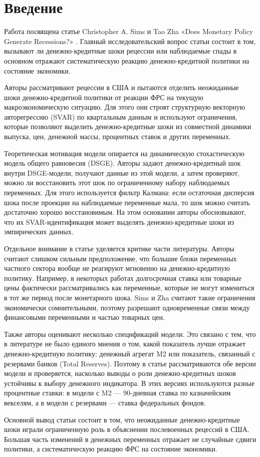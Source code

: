 \section*{Введение}
Работа посвящена статье Christopher A. Sims и Tao Zha «Does Monetary Policy Generate Recessions?» \cite{SIMS2006}. Главный исследовательский вопрос статьи состоит в том, вызывают ли денежно-кредитные шоки рецессии или наблюдаемые спады в основном отражают систематическую реакцию денежно-кредитной политики на состояние экономики.

Авторы рассматривают рецессии в США и пытаются отделить неожиданные шоки денежно-кредитной политики от реакции ФРС на текущую макроэкономическую ситуацию. Для этого они строят структурную векторную авторегрессию (SVAR) по квартальным данным и используют ограничения, которые позволяют выделить денежно-кредитные шоки из совместной динамики выпуска, цен, денежной массы, процентных ставок и других переменных.

Теоретическая мотивация модели опирается на динамическую стохастическую модель общего равновесия (DSGE). Авторы задают денежно-кредитный шок внутри DSGE-модели, получают данные из этой модели, а затем проверяют, можно ли восстановить этот шок по ограниченному набору наблюдаемых переменных. Для этого используется фильтр Калмана: если остаточная дисперсия шока после проекции на наблюдаемые переменные мала, то шок можно считать достаточно хорошо восстановимым. На этом основании авторы обосновывают, что их SVAR-идентификация может выделять денежно-кредитные шоки из эмпирических данных.

Отдельное внимание в статье уделяется критике части литературы. Авторы считают слишком сильным предположение, что большие блоки переменных частного сектора вообще не реагируют мгновенно на денежно-кредитную политику. Например, в некоторых работах долгосрочная ставка или товарные цены фактически рассматривались как переменные, которые не могут измениться в тот же период после монетарного шока. Sims и Zha считают такие ограничения экономически сомнительными, поэтому разрешают одновременные связи между финансовыми переменными и частью товарных цен.

Также авторы оценивают несколько спецификаций модели. Это связано с тем, что в литературе не было единого мнения о том, какой показатель лучше отражает денежно-кредитную политику: денежный агрегат M2 или показатель, связанный с резервами банков (Total Reserves). Поэтому в статье рассматриваются обе версии модели и проверяется, насколько выводы о роли денежно-кредитных шоков устойчивы к выбору денежного индикатора. В этих версиях используются разные процентные ставки: в модели с M2 — 90-дневная ставка по казначейским векселям, а в модели с резервами — ставка федеральных фондов.

Основной вывод статьи состоит в том, что неожиданные денежно-кредитные шоки играли ограниченную роль в объяснении послевоенных рецессий в США. Большая часть изменений в денежных переменных отражает не случайные сдвиги политики, а систематическую реакцию ФРС на состояние экономики.
